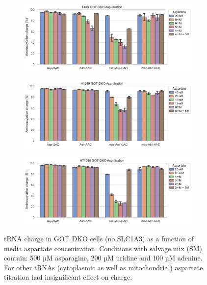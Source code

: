 \begin{figure}[!ht]
     \centering
     \begin{subfigure}[b]{0.7\textwidth}
         \includegraphics[width=\textwidth]{figures/sapp/tRNA/143B-DKO_Asp-Asn.pdf}
     \end{subfigure}
     \begin{subfigure}[b]{0.7\textwidth}
         \vspace{5pt}
         \includegraphics[width=\textwidth]{figures/sapp/tRNA/H1299-DKO_charge_Asp-Asn.pdf}
     \end{subfigure}
     \begin{subfigure}[b]{0.7\textwidth}
         \vspace{5pt}
         \includegraphics[width=\textwidth]{figures/sapp/tRNA/HT1080-DKO_charge_Asp-Asn.pdf}
     \end{subfigure}
     \hfill
        \caption[tRNA charge in GOT DKO Asp-tit]{
        tRNA charge in GOT DKO cells (no SLC1A3) as a function of media aspartate concentration.
        Conditions with salvage mix (SM) contain: 500 µM asparagine, 200 µM uridine and 100 µM adenine.
        For other tRNAs (cytoplasmic as well as mitochondrial) aspartate titration had insignificant effect on charge.
        }
        \label{fig:sapp:tRNA:DKO_Asp-Asn}
\end{figure}



